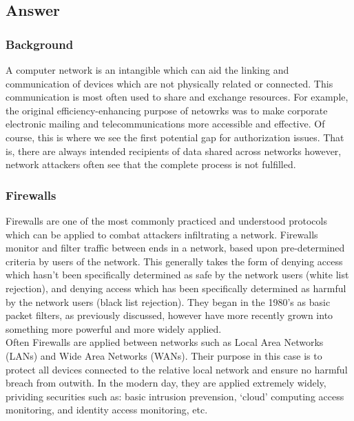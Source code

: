 \documentclass[11pt, english]{article}
\begin{document}
	\subsection{Answer}

		\subsubsection{Background}

	A computer network is an intangible which can aid the linking and communication of devices which are not physically related or connected. This communication is most often used to share and exchange resources. For example, the original efficiency-enhancing purpose of netowrks was to make corporate electronic mailing and telecommunications more accessible and effective. Of course, this is where we see the first potential gap for authorization issues. That is, there are always intended recipients of data shared across networks however, network attackers often see that the complete process is not fulfilled.

		\subsubsection{Firewalls}

	Firewalls are one of the most commonly practiced and understood protocols which can be applied to combat attackers infiltrating a network. Firewalls monitor and filter traffic between ends in a network, based upon pre-determined criteria by users of the network. This generally takes the form of denying access which hasn't been specifically determined as safe by the network users (white list rejection), and denying access which has been specifically determined as harmful by the network users (black list rejection). They began in the 1980's as basic packet filters, as previously discussed, however have more recently grown into something more powerful and more widely applied.\\

	Often Firewalls are applied between networks such as Local Area Networks (LANs) and Wide Area Networks (WANs). Their purpose in this case is to protect all devices connected to the relative local network and ensure no harmful breach from outwith. In the modern day, they are applied extremely widely, prividing securities such as: basic intrusion prevension, `cloud' computing access monitoring, and identity access monitoring, etc.\\
\end{document}
